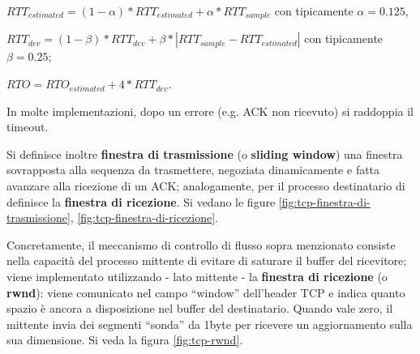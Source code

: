 \documentclass[11pt, italian, openany]{book}
\begin{document}
\begin{sloppypar}
\begin{itemize}[topsep=0pt, itemsep=0pt, parsep=0pt]
\begin{itemize}[topsep=0pt, itemsep=0pt, parsep=0pt]
		\( RTT_{estimated} =  (1 - \alpha) * RTT_{estimated} + \alpha * RTT_{sample} \) con tipicamente \( \alpha = 0.125\),

		\(RTT_{dev} = (1 - \beta) * RTT_{dev} + \beta * | RTT_{sample} - RTT_{estimated} | \) con tipicamente \( \beta = 0.25 \);

		\( RTO = RTO_{estimated} + 4 * RTT_{dev}\).

		In molte implementazioni, dopo un errore (e.g. ACK non ricevuto) si raddoppia il timeout.

		Si definisce inoltre \textbf{finestra di trasmissione} (o \textbf{sliding window}) una finestra sovrapposta alla sequenza da trasmettere, negoziata
		dinamicamente e fatta avanzare alla ricezione di un ACK; analogamente, per il processo destinatario di definisce la \textbf{finestra di ricezione}.
		Si vedano le figure \ref{fig:tcp-finestra-di-trasmissione}, \ref{fig:tcp-finestra-di-ricezione}.

		Concretamente, il meccanismo di controllo di flusso sopra menzionato consiste nella capacit\`a del processo mittente di evitare di saturare il buffer
		del ricevitore; viene implementato utilizzando - lato mittente - la \textbf{finestra di ricezione} (o \textbf{rwnd}): viene comunicato nel campo
		``window'' dell'header TCP e indica quanto spazio \`e ancora a disposizione nel buffer del destinatario. Quando vale zero, il mittente invia dei
		segmenti ``sonda'' da 1byte per ricevere un aggiornamento sulla sua dimensione. Si veda la figura \ref{fig:tcp-rwnd}.


\end{itemize}
\end{itemize}
\end{sloppypar}
\end{document}
